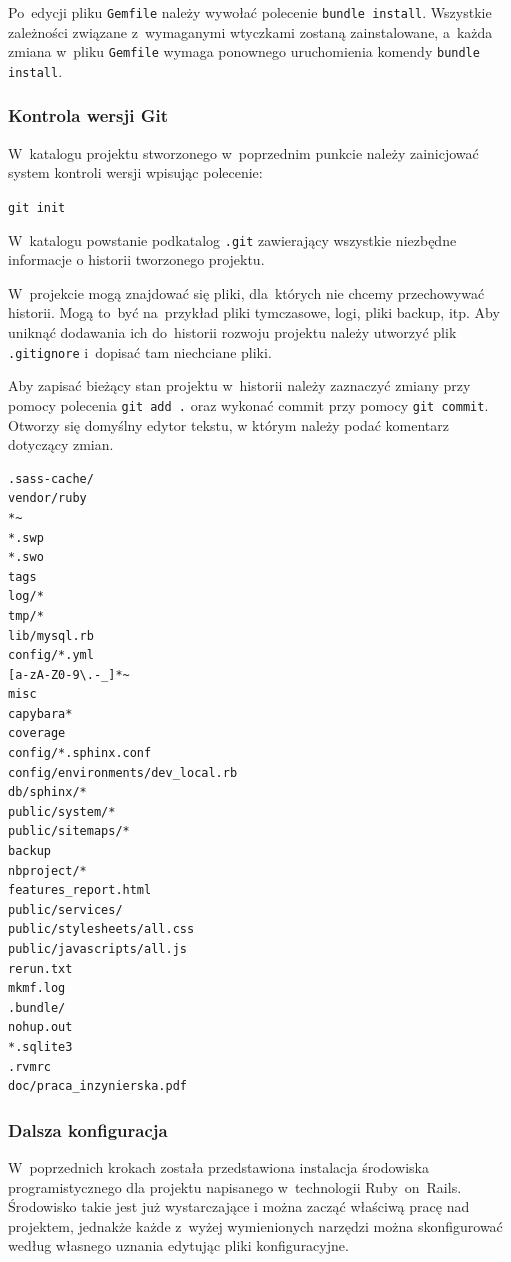 Po~edycji pliku \texttt{Gemfile} należy wywołać polecenie \texttt{bundle install}. Wszystkie zależności związane z~wymaganymi wtyczkami zostaną zainstalowane, a~każda zmiana w~pliku \texttt{Gemfile} wymaga ponownego uruchomienia komendy \texttt{bundle install}.

\subsubsection{Kontrola wersji Git}

W~katalogu projektu stworzonego w~poprzednim punkcie należy zainicjować system kontroli wersji wpisując polecenie:


\texttt{git init}


W~katalogu powstanie podkatalog \texttt{.git} zawierający wszystkie niezbędne informacje o historii tworzonego projektu.


W~projekcie mogą znajdować się pliki, dla~których nie chcemy przechowywać historii. Mogą to~być na~przykład pliki tymczasowe, logi, pliki backup, itp. Aby uniknąć dodawania ich do~historii rozwoju projektu należy utworzyć plik \texttt{.gitignore} i~dopisać tam niechciane pliki.


Aby zapisać bieżący stan projektu w~historii należy zaznaczyć zmiany przy pomocy polecenia \texttt{git add .} oraz wykonać commit przy pomocy \texttt{git commit}. Otworzy się domyślny edytor tekstu, w którym należy podać komentarz dotyczący zmian.

 \label{code.railsdir}
\begin{lstlisting}
.sass-cache/
vendor/ruby
*~
*.swp
*.swo
tags
log/*
tmp/*
lib/mysql.rb
config/*.yml
[a-zA-Z0-9\.-_]*~
misc
capybara*
coverage
config/*.sphinx.conf
config/environments/dev_local.rb
db/sphinx/*
public/system/*
public/sitemaps/*
backup
nbproject/*
features_report.html
public/services/
public/stylesheets/all.css
public/javascripts/all.js
rerun.txt
mkmf.log
.bundle/
nohup.out
*.sqlite3
.rvmrc
doc/praca_inzynierska.pdf
\end{lstlisting}

\subsubsection{Dalsza konfiguracja}

W~poprzednich krokach została przedstawiona instalacja środowiska programistycznego dla projektu napisanego w~technologii Ruby~on~Rails. Środowisko takie jest już wystarczające i można zacząć właściwą pracę nad projektem, jednakże każde z~wyżej wymienionych narzędzi można skonfigurować według własnego uznania edytując pliki konfiguracyjne.


